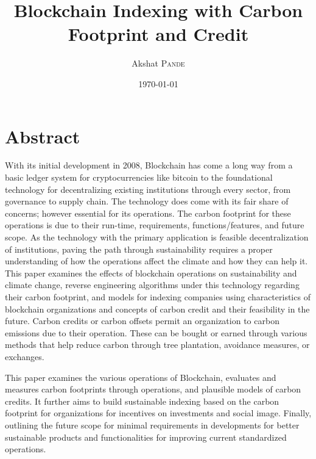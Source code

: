 \documentclass[11pt, a4paper]{article}
\title{Blockchain Indexing with Carbon Footprint and Credit}
\author{Akshat \textsc{Pande}}
\date{\today}
\begin{document}




\section*{Abstract}


With its initial development in 2008, Blockchain has come a long way from a basic ledger system for cryptocurrencies like bitcoin to the foundational technology for decentralizing existing institutions through every sector, from governance to supply chain. The technology does come with its fair share of concerns; however essential for its operations. The carbon footprint for these operations is due to their run-time, requirements, functions/features, and future scope. As the technology with the primary application is feasible decentralization of institutions, paving the path through sustainability requires a proper understanding of how the operations affect the climate and how they can help it. This paper examines the effects of blockchain operations on sustainability and climate change, reverse engineering algorithms under this technology regarding their carbon footprint, and models for indexing companies using characteristics of blockchain organizations and concepts of carbon credit and their feasibility in the future. 
Carbon credits or carbon offsets permit an organization to carbon emissions due to their operation. These can be bought or earned through various methods that help reduce carbon through tree plantation, avoidance measures, or exchanges. 

This paper examines the various operations of Blockchain, evaluates and measures carbon footprints through operations, and plausible models of carbon credits. It further aims to build sustainable indexing based on the carbon footprint for organizations for incentives on investments and social image. Finally, outlining the future scope for minimal requirements in developments for better sustainable products and functionalities for improving current standardized operations.
\end{document}
